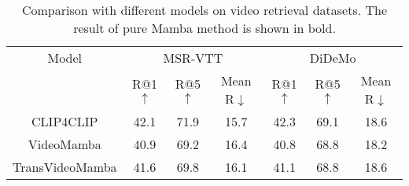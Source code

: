 

\begin{table}[t]
\centering
\scalebox{0.7}
{
\begin{tabular}{c|cccccc}
\toprule
Model & \multicolumn{3}{c}{MSR-VTT} & \multicolumn{3}{c}{DiDeMo} \\ 
                       & R@1$\uparrow$       & R@5$\uparrow$       & Mean R$\downarrow$  & R@1$\uparrow$      & R@5$\uparrow$       & Mean R$\downarrow$   \\ \midrule
CLIP4CLIP              & 42.1    & 71.9      & 15.7  & 42.3    & 69.1     & 18.6  \\
{\color[HTML]{808080}VideoMamba}             & {\color[HTML]{808080}40.9}    & {\color[HTML]{808080}69.2}    & {\color[HTML]{808080}16.4}  & {\color[HTML]{808080}40.8}    & {\color[HTML]{808080}68.8}    & {\color[HTML]{808080} 18.2}   \\
TransVideoMamba    & 41.6    & 69.8     & 16.1   & 41.1    & 68.8    & 18.6 \\ \midrule
\end{tabular}}
\caption{
Comparison with different models on video retrieval datasets. 
The result of pure Mamba method is shown in bold.
}
\label{tab:results_video}
\end{table}